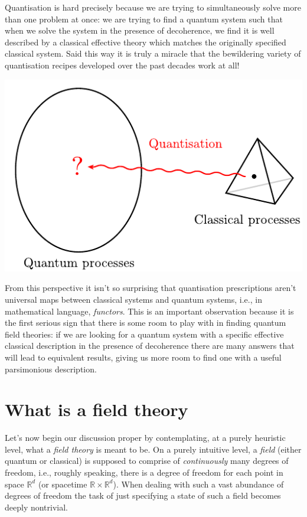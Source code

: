 \documentclass[11pt]{amsart}
\theoremstyle{plain}%
\theoremstyle{definition}
\theoremstyle{remark}
\begin{document}
Quantisation is hard precisely because we are trying to simultaneously solve more than one problem at once: we are trying to find a quantum system such that when we solve the system in the presence of decoherence, we find it is well described by a classical effective theory which matches the originally specified classical system. Said this way it is truly a miracle that the bewildering variety of quantisation recipes developed over the past decades work at all! 
\begin{center}
\includegraphics{Quantisation.pdf}
\end{center}
From this perspective it isn't so surprising that quantisation prescriptions aren't universal maps between classical systems and quantum systems, i.e., in mathematical language, \emph{functors}. This is an important observation because it is the first serious sign that there is some room to play with in finding quantum field theories: if we are looking for a quantum system with a specific effective classical description in the presence of decoherence there are many answers that will lead to equivalent results, giving us more room to find one with a useful parsimonious description. 

\section{What is a field theory}\label{sec:whatisqft}
Let's now begin our discussion proper by contemplating, at a purely heuristic level, what a \emph{field theory} is meant to be. On a purely intuitive level, a \emph{field} (either quantum or classical) is supposed to comprise of \emph{continuously} many degrees of freedom, i.e., roughly speaking, there is a degree of freedom for each point in space $\mathbb{R}^d$ (or spacetime $\mathbb{R}\times \mathbb{R}^d$). When dealing with such a vast abundance of degrees of freedom the task of just specifying a state of such a field becomes deeply nontrivial. 
\end{document}

